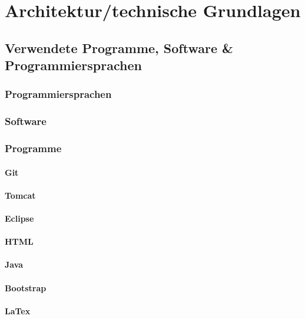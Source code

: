 \clearpage
\chapter{Architektur/technische Grundlagen}
\section{Verwendete Programme, Software \& Programmiersprachen}
\subsection{Programmiersprachen}
\subsection{Software}
\subsection{Programme}
\subsubsection{Git}
\subsubsection{Tomcat}
\subsubsection{Eclipse}
\subsubsection{HTML}
\subsubsection{Java}
\subsubsection{Bootstrap}
\subsubsection{LaTex}